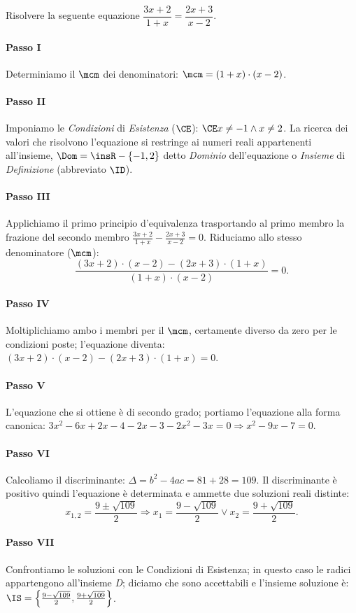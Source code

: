 \begin{esempio}
Risolvere la seguente equazione \(\dfrac{3 x + 2}{1 + x}=\dfrac{2 x + 3}{x - 2}\).
 \paragraph{Passo I} Determiniamo il \(\mcm\) dei denominatori: \(\mcm = ( 1 + x ) 
\cdot ( x - 2 )\).
 \paragraph{Passo II} Imponiamo le \emph{Condizioni} di \emph{Esistenza} 
(\(\CE\)): \(\CE x \neq - 1 \wedge x \neq 2\). La ricerca dei valori che risolvono 
l'equazione si restringe ai numeri reali appartenenti all'insieme, \(\Dom = 
\insR 
- \{- 1, 2 \}\) detto \emph{Dominio} dell'equazione o \emph{Insieme} di 
\emph{Definizione} (abbreviato \(\ID\)).
 \paragraph{Passo III} Applichiamo il primo principio d'equivalenza 
trasportando 
al primo membro la frazione del secondo membro \(\frac{3 x + 2}{1 + x} - \frac{2 
x + 3}{x - 2} = 0\). Riduciamo allo stesso denominatore (\(\mcm\)): 
\[\frac{( 3 x + 2 ) \cdot ( x - 2 ) - ( 2 x + 3 ) \cdot ( 1 + x )}{( 1 +x ) 
\cdot ( x - 2 )}=0.\]
 \paragraph{Passo IV} Moltiplichiamo ambo i membri per il \(\mcm\), certamente 
diverso da zero per le condizioni poste; l'equazione diventa: \(( 3 x + 2 ) 
\cdot 
( x - 2 ) - ( 2 x + 3 ) \cdot ( 1 + x )=0\).
 \paragraph{Passo V} L'equazione che si ottiene è di secondo grado; portiamo 
l'equazione alla forma canonica: \(3 x^{2} - 6 x + 2 x - 4 - 2 x - 3 - 2 x^{2} - 
3 x=0 \Rightarrow x^{2} - 9 x - 7=0\).
 \paragraph{Passo VI} Calcoliamo il discriminante: \(\Delta=b^{2} - 4 a c=81 + 
28 
= 109\). Il discriminante è positivo quindi l'equazione è determinata e ammette 
due soluzioni reali distinte: 
\[x_{1,2}=\frac{9 \pm \sqrt{109}}{2} \Rightarrow x_{1}=\frac{9 - \sqrt{109}}{2} 
\vee x_{2}=\frac{9 + \sqrt{109}}{2}.\]
 \paragraph{Passo VII} Confrontiamo le soluzioni con le Condizioni di 
Esistenza; 
in questo caso le radici appartengono all'insieme \emph{D}; diciamo che sono 
accettabili e l'insieme soluzione è: \(\IS=\left\{\frac{9 - \sqrt{109}}{2}, 
\frac{9 +\sqrt{109}}{2} \right\}\).
 \end{esempio}

